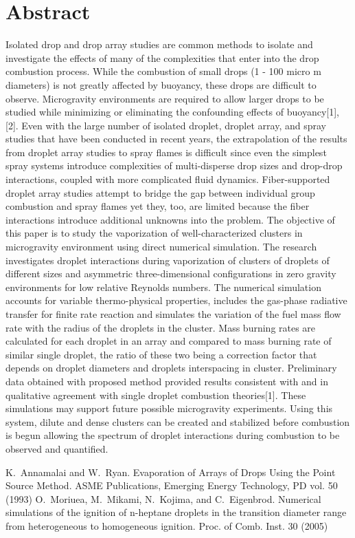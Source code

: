 \section*{Abstract}
Isolated drop and drop array studies are common methods to isolate and investigate the effects of many of the complexities that enter into the drop combustion process. While the combustion of small drops (1 - 100 micro m diameters) is not greatly affected by buoyancy, these drops are difficult to observe. Microgravity environments are required to allow larger drops to be studied while minimizing or eliminating the confounding effects of buoyancy[1],[2]. Even with the large number of isolated droplet, droplet array, and spray studies that have been conducted in recent years, the extrapolation of the results from droplet array studies to spray flames is difficult since even the simplest spray systems introduce complexities of multi-disperse drop sizes and drop-drop interactions, coupled with more complicated fluid dynamics. Fiber-supported droplet array studies attempt to bridge the gap between individual group combustion and spray flames yet they, too, are limited because the fiber interactions introduce additional unknowns into the problem. The objective of this paper is to study the vaporization of well-characterized clusters in microgravity environment using direct numerical simulation. The research investigates droplet interactions during vaporization of clusters of droplets of different sizes and asymmetric three-dimensional configurations in zero gravity environments for low relative Reynolds numbers. The numerical simulation accounts for variable thermo-physical properties, includes the gas-phase radiative transfer for finite rate reaction and simulates the variation of the fuel mass flow rate with the radius of the droplets in the cluster. Mass burning rates are calculated for each droplet in an array and compared to mass burning rate of similar single droplet, the ratio of these two being a correction factor that depends on droplet diameters and droplets interspacing in cluster. Preliminary data obtained with proposed method provided results consistent with and in qualitative agreement with single droplet combustion theories[1]. These simulations may support future possible microgravity experiments. Using this system, dilute and dense clusters can be created and stabilized before combustion is begun allowing the spectrum of droplet interactions during combustion to be observed and quantified. 

\begin{thebibliography}{10}
{\sc K.~Annamalai and W.~Ryan}. {Evaporation of Arrays of Drops Using the Point Source Method}. ASME Publications, Emerging Energy Technology, PD vol. 50 (1993)
{\sc O.~Moriuea, M.~Mikami, N.~Kojima, and C.~Eigenbrod}. {Numerical simulations of the ignition of n-heptane droplets in the transition diameter range from heterogeneous to homogeneous ignition}. Proc. of Comb. Inst. 30 (2005)

\end{thebibliography}
